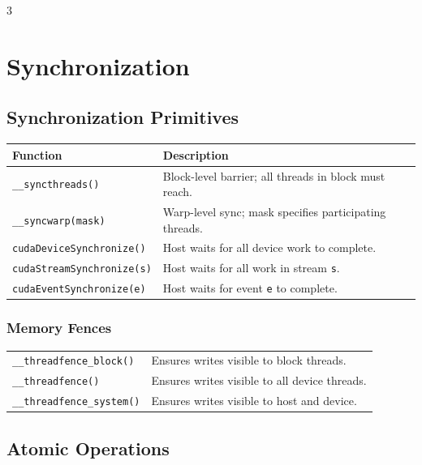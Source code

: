 \begin{multicols*}{3}
\section*{Synchronization}

\subsection*{Synchronization Primitives}

\begin{tabularx}{\linewidth}{lX}
\hline
\textbf{Function} & \textbf{Description} \\
\hline
\texttt{\_\_syncthreads()}       & Block-level barrier; all threads in block must reach. \\
\texttt{\_\_syncwarp(mask)}      & Warp-level sync; mask specifies participating threads. \\
\texttt{cudaDeviceSynchronize()} & Host waits for all device work to complete. \\
\texttt{cudaStreamSynchronize(s)} & Host waits for all work in stream \texttt{s}. \\
\texttt{cudaEventSynchronize(e)} & Host waits for event \texttt{e} to complete. \\
\hline
\end{tabularx}

\subsubsection*{Memory Fences}

\begin{tabularx}{\linewidth}{lX}
\texttt{\_\_threadfence\_block()} & Ensures writes visible to block threads. \\
\texttt{\_\_threadfence()}        & Ensures writes visible to all device threads. \\
\texttt{\_\_threadfence\_system()} & Ensures writes visible to host and device. \\
\end{tabularx}

\subsection*{Atomic Operations}


\end{multicols*}
